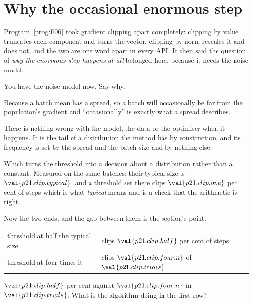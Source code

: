 \section{Why the occasional enormous step}
\label{sec:P21-clipping}

\begin{fr}
Program~\ref{prog:F06} took gradient clipping apart completely: clipping by
value truncates each component and turns the vector, clipping by norm rescales
it and does not, and the two are one word apart in every API. It then said the
question of \emph{why the enormous step happens at all} belonged here, because
it needs the noise model.

You have the noise model now. Say why.
\dotline
\nextframe
\end{fr}

\begin{fr}
\begin{ansblock}
Because a batch mean has a spread, so a batch will occasionally be far from
the population's gradient \dash{} and \enquote{occasionally} is exactly what a
spread describes.
\end{ansblock}

There is nothing wrong with the model, the data or the optimiser when it
happens. It is the tail of a distribution the method has by construction, and
its frequency is set by the spread and the batch size and by nothing else.

Which turns the threshold into a decision about a distribution rather than a
constant. Measured on the same batches: their typical size is
$\val{p21.clip.typical}$, and a threshold set there clips
$\val{p21.clip.one}$ per cent of steps \dash{} which is what \emph{typical}
means and is a check that the arithmetic is right.
\end{fr}

\begin{fr}
Now the two ends, and the gap between them is the section's point.

\begin{center}
\begin{tabular}{ll}
\toprule
threshold at half the typical size & clips $\val{p21.clip.half}$ per cent of steps \\
threshold at four times it & clips $\val{p21.clip.four.n}$ of $\val{p21.clip.trials}$ \\
\bottomrule
\end{tabular}
\end{center}

$\val{p21.clip.half}$ per cent against $\val{p21.clip.four.n}$ in
$\val{p21.clip.trials}$. What is the algorithm doing in the first row?
\nextframe
\end{fr}


